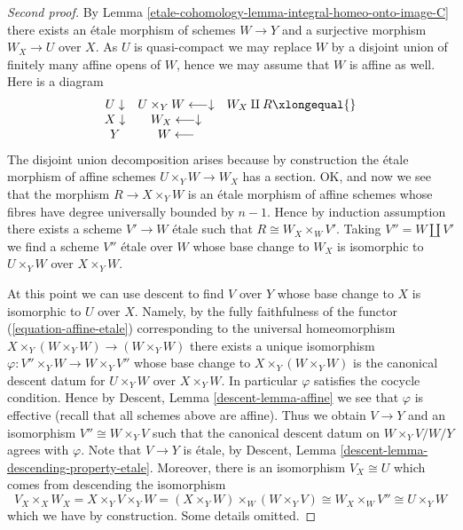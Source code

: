 \begin{proof}[Second proof]
\medskip\noindent
By
Lemma \ref{etale-cohomology-lemma-integral-homeo-onto-image-C}
there exists an \'etale morphism of schemes $W \to Y$ and a
surjective morphism $W_X \to U$ over $X$.
As $U$ is quasi-compact we may replace $W$ by a disjoint union of
finitely many affine opens of $W$, hence we may assume that $W$
is affine as well. Here is a diagram
$$
\begin{array}{ccc}U \downarrow & U \times_Y W \longleftarrow\downarrow & W_X \amalg R \xlongequal{} \\ X \downarrow & W_X \longleftarrow\downarrow &  \\ Y & W \longleftarrow & \end{array}
$$
The disjoint union decomposition arises because by construction the
\'etale morphism of affine schemes $U \times_Y W \to W_X$ has a section.
OK, and now we see that the morphism $R \to X \times_Y W$ is an \'etale
morphism of affine schemes whose fibres have degree universally bounded
by $n - 1$. Hence by induction assumption there exists a scheme
$V' \to W$ \'etale such that $R \cong W_X \times_W V'$.
Taking $V'' = W \amalg V'$ we find a scheme $V''$ \'etale over $W$ whose
base change to $W_X$ is isomorphic to $U \times_Y W$
over $X \times_Y W$.

\medskip\noindent
At this point we can use descent to find $V$ over $Y$ whose base
change to $X$ is isomorphic to $U$ over $X$. Namely, by the fully
faithfulness of the functor (\ref{equation-affine-etale})
corresponding to the universal homeomorphism
$X \times_Y (W \times_Y W) \to (W \times_Y W)$
there exists a unique isomorphism $\varphi : V'' \times_Y W \to W \times_Y V''$
whose base change to $X \times_Y (W \times_Y W)$ is the canonical
descent datum for $U \times_Y W$ over $X \times_Y W$. In particular
$\varphi$ satisfies the cocycle condition. Hence by
Descent, Lemma \ref{descent-lemma-affine}
we see that $\varphi$ is effective (recall that all schemes above are affine).
Thus we obtain $V \to Y$ and an isomorphism $V'' \cong W \times_Y V$
such that the canonical descent datum on $W \times_Y V/W/Y$ agrees
with $\varphi$. Note that $V \to Y$ is \'etale, by
Descent, Lemma \ref{descent-lemma-descending-property-etale}.
Moreover, there is an isomorphism $V_X \cong U$ which comes from
descending the isomorphism
$$
V_X \times_X W_X =
X \times_Y V \times_Y W =
(X \times_Y W) \times_W (W \times_Y V) \cong
W_X  \times_W V'' \cong U \times_Y W
$$
which we have by construction. Some details omitted.
\end{proof}

